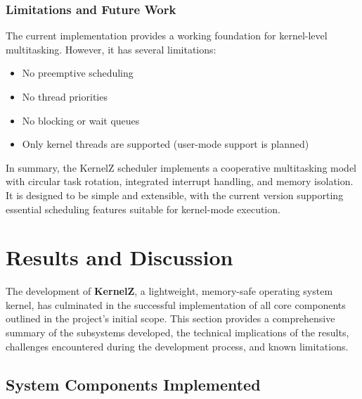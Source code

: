 \documentclass[12pt]{extarticle}
\begin{document}
\subsubsection*{Limitations and Future Work}

The current implementation provides a working foundation for kernel-level multitasking. However, it has several limitations:

\begin{itemize}
    \item No preemptive scheduling
    \item No thread priorities
    \item No blocking or wait queues
    \item Only kernel threads are supported (user-mode support is planned)
\end{itemize}

In summary, the KernelZ scheduler implements a cooperative multitasking model with circular task rotation, integrated interrupt handling, and memory isolation. It is designed to be simple and extensible, with the current version supporting essential scheduling features suitable for kernel-mode execution.

\pagebreak




\section{Results and Discussion}

The development of \textbf{KernelZ}, a lightweight, memory-safe operating system kernel, has culminated in the successful implementation of all core components outlined in the project's initial scope. This section provides a comprehensive summary of the subsystems developed, the technical implications of the results, challenges encountered during the development process, and known limitations.

\subsection{System Components Implemented}
\end{document}
